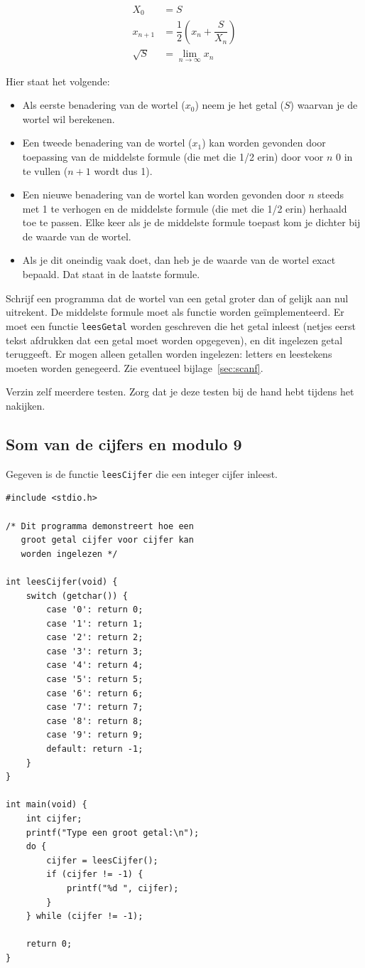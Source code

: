 \documentclass[a4paper,10pt,fleqn,twoside]{article}
\begin{document}
\begin{align*}
X_0 &= S \\
x_{n+1} &= \dfrac{1}{2}\left(x_n + \dfrac{S}{X_n}\right) \\
\sqrt{S} &= \lim\limits_{n\rightarrow\infty} x_n
\end{align*}

Hier staat het volgende:

\begin{itemize}
\item Als eerste benadering van de wortel ($x_0$) neem je het getal ($S$) waarvan je de wortel wil berekenen.
\item Een tweede benadering van de wortel ($x_1$) kan worden gevonden door toepassing van de middelste formule (die met die 1/2 erin) door voor $n$ 0 in te vullen ($n+1$ wordt dus 1).
\item Een nieuwe benadering van de wortel kan worden gevonden door $n$ steeds met 1 te verhogen en de middelste formule (die met die 1/2 erin) herhaald toe te passen. Elke keer als je de middelste formule toepast kom je dichter bij de waarde van de wortel.
\item Als je dit oneindig vaak doet, dan heb je de waarde van de wortel exact bepaald. Dat staat in de laatste formule.
\end{itemize}

Schrijf een programma dat de wortel van een getal groter dan of gelijk aan nul uitrekent. De middelste formule moet als functie worden geïmplementeerd. Er moet een functie \lstinline|leesGetal| worden geschreven die het getal inleest (netjes eerst tekst afdrukken dat een getal moet worden opgegeven), en dit ingelezen getal teruggeeft. Er mogen alleen getallen worden ingelezen: letters en leestekens moeten worden genegeerd. Zie eventueel bijlage~\ref{sec:scanf}.

Verzin zelf meerdere testen. Zorg dat je deze testen bij de hand hebt tijdens het nakijken.

\subsection{Som van de cijfers en modulo 9}
Gegeven is de functie \lstinline|leesCijfer| die een integer cijfer inleest. 

\begin{lstlisting}
#include <stdio.h>

/* Dit programma demonstreert hoe een
   groot getal cijfer voor cijfer kan
   worden ingelezen */

int leesCijfer(void) {
    switch (getchar()) {
        case '0': return 0;
        case '1': return 1;
        case '2': return 2;
        case '3': return 3;
        case '4': return 4;
        case '5': return 5;
        case '6': return 6;
        case '7': return 7;
        case '8': return 8;
        case '9': return 9;
        default: return -1;
    }
}

int main(void) {
    int cijfer;
    printf("Type een groot getal:\n");
    do {
        cijfer = leesCijfer();
        if (cijfer != -1) {
            printf("%d ", cijfer);
        }
    } while (cijfer != -1);
    
    return 0;
}
\end{lstlisting}
\end{document}
